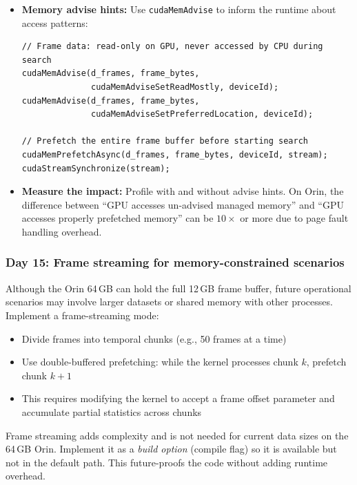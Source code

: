 \documentclass[11pt,letterpaper]{article}
\begin{document}
\begin{itemize}[leftmargin=2em]
    \item \textbf{Memory advise hints:} Use \texttt{cudaMemAdvise} to
    inform the runtime about access patterns:

\begin{lstlisting}[style=cudastyle]
// Frame data: read-only on GPU, never accessed by CPU during search
cudaMemAdvise(d_frames, frame_bytes,
              cudaMemAdviseSetReadMostly, deviceId);
cudaMemAdvise(d_frames, frame_bytes,
              cudaMemAdviseSetPreferredLocation, deviceId);

// Prefetch the entire frame buffer before starting search
cudaMemPrefetchAsync(d_frames, frame_bytes, deviceId, stream);
cudaStreamSynchronize(stream);
\end{lstlisting}

    \item \textbf{Measure the impact:} Profile with and without advise
    hints. On Orin, the difference between ``GPU accesses un-advised
    managed memory'' and ``GPU accesses properly prefetched memory'' can
    be $10\times$ or more due to page fault handling overhead.
\end{itemize}

\subsubsection{Day 15: Frame streaming for memory-constrained scenarios}

Although the Orin 64\,GB can hold the full 12\,GB frame buffer, future
operational scenarios may involve larger datasets or shared memory with
other processes. Implement a frame-streaming mode:

\begin{itemize}[leftmargin=2em]
    \item Divide frames into temporal chunks (e.g., 50 frames at a time)
    \item Use double-buffered prefetching: while the kernel processes
    chunk $k$, prefetch chunk $k+1$
    \item This requires modifying the kernel to accept a frame offset
    parameter and accumulate partial statistics across chunks
\end{itemize}

\begin{notebox}
Frame streaming adds complexity and is not needed for current data sizes
on the 64\,GB Orin. Implement it as a \emph{build option} (compile flag)
so it is available but not in the default path. This future-proofs the
code without adding runtime overhead.
\end{notebox}
\end{document}
